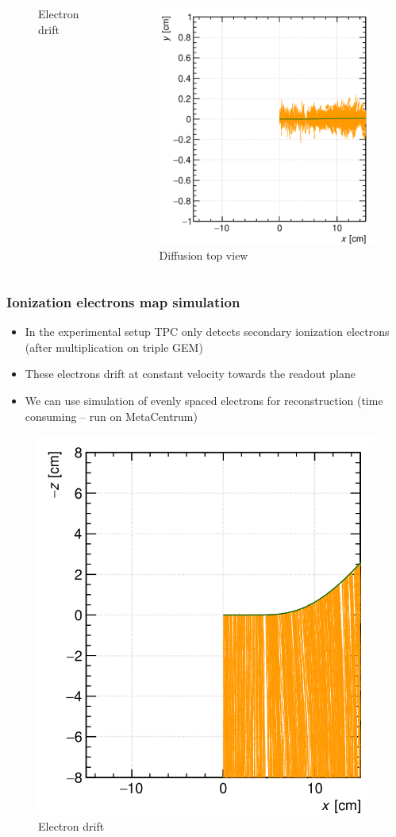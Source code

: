 \documentclass{beamer}
\begin{document}
\begin{frame}
\begin{columns}
\begin{figure}
				\caption{Electron drift}
			\end{figure}
			\begin{figure}
				\centering
				\includegraphics[width = 0.95 \linewidth]{images/track3.png}
				\caption{Diffusion top view}
			\end{figure}
		\end{columns}
	\end{frame}

	\begin{frame}
		\frametitle{Ionization electrons map simulation}
		\begin{itemize}
			\item In the experimental setup TPC only detects secondary ionization electrons (after multiplication on triple GEM)
			\item These electrons drift at constant velocity towards the readout plane
			\item We can use simulation of evenly spaced electrons for reconstruction (time consuming -- run on MetaCentrum)
		\end{itemize}
		\begin{figure}
			\centering
			\includegraphics[width = 0.3 \linewidth]{images/track2.png}
			\caption{Electron drift}
		\end{figure}
	\end{frame}
\end{document}
